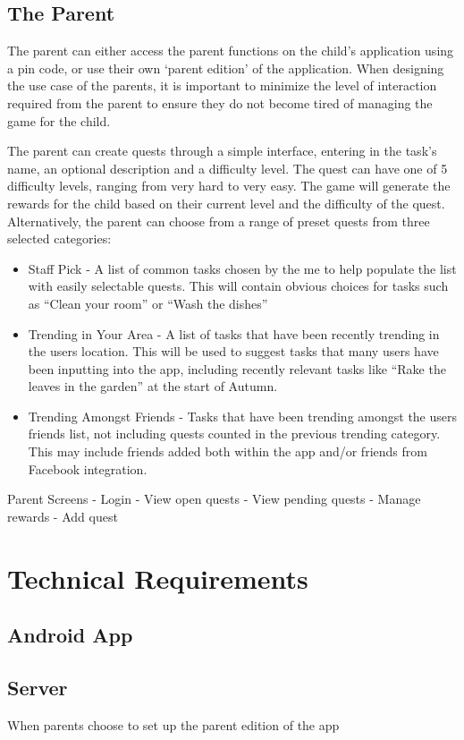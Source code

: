 \subsection{The Parent}
The parent can either access the parent functions on the child's application using a pin code, or use their own `parent edition' of the application. 
When designing the use case of the parents, it is important to minimize the level of interaction required from the parent to ensure they do not become tired of managing the game for the child.

The parent can create quests through a simple interface, entering in the task's name, an optional description and a difficulty level. 
The quest can have one of 5 difficulty levels, ranging from very hard to very easy.
The game will generate the rewards for the child based on their current level and the difficulty of the quest.
Alternatively, the parent can choose from a range of preset quests from three selected categories:
\begin{itemize}
	\item 
		Staff Pick - A list of common tasks chosen by the me to help populate the list with easily selectable quests. 
		This will contain obvious choices for tasks such as ``Clean your room'' or ``Wash the dishes''
	\item
		Trending in Your Area - A list of tasks that have been recently trending in the users location. 
		This will be used to suggest tasks that many users have been inputting into the app, including recently relevant tasks like ``Rake the leaves in the garden'' at the start of Autumn.
	\item 
		Trending Amongst Friends - Tasks that have been trending amongst the users friends list, not including quests counted in the previous 	trending category. 
		This may include friends added both within the app and/or friends from Facebook integration.  
\end{itemize}

Parent Screens
- Login
- View open quests
- View pending quests
- Manage rewards
- Add quest

\section{Technical Requirements}
\subsection{Android App}

\subsection{Server}
When parents choose to set up the parent edition of the app

